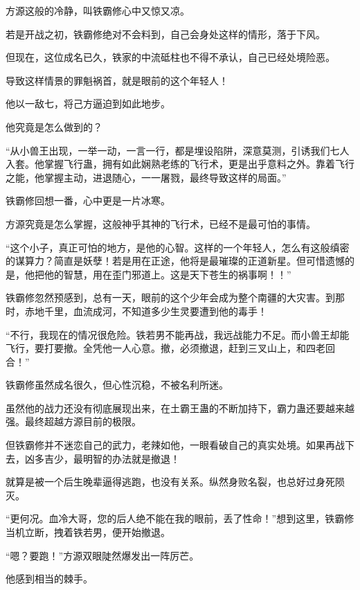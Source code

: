 
\begin{this_body}



方源这般的冷静，叫铁霸修心中又惊又凉。

若是开战之初，铁霸修绝对不会料到，自己会身处这样的情形，落于下风。

但现在，这位成名已久，铁家的中流砥柱也不得不承认，自己已经处境险恶。

导致这样情景的罪魁祸首，就是眼前的这个年轻人！

他以一敌七，将己方逼迫到如此地步。

他究竟是怎么做到的？

“从小兽王出现，一举一动，一言一行，都是埋设陷阱，深意莫测，引诱我们七人入套。他掌握飞行蛊，拥有如此娴熟老练的飞行术，更是出乎意料之外。靠着飞行之能，他掌握主动，进退随心，一一屠戮，最终导致这样的局面。”

铁霸修回想一番，心中更是一片冰寒。

方源究竟是怎么掌握，这般神乎其神的飞行术，已经不是最可怕的事情。

“这个小子，真正可怕的地方，是他的心智。这样的一个年轻人，怎么有这般缜密的谋算力？简直是妖孽！若是用在正途，他将是最璀璨的正道新星。但可惜遗憾的是，他把他的智慧，用在歪门邪道上。这是天下苍生的祸事啊！！”

铁霸修忽然预感到，总有一天，眼前的这个少年会成为整个南疆的大灾害。到那时，赤地千里，血流成河，不知道多少生灵要遭到他的毒手！

“不行，我现在的情况很危险。铁若男不能再战，我远战能力不足。而小兽王却能飞行，要打要撤。全凭他一人心意。撤，必须撤退，赶到三叉山上，和四老回合！”

铁霸修虽然成名很久，但心性沉稳，不被名利所迷。

虽然他的战力还没有彻底展现出来，在土霸王蛊的不断加持下，霸力蛊还要越来越强。最终超越方源目前的极限。

但铁霸修并不迷恋自己的武力，老辣如他，一眼看破自己的真实处境。如果再战下去，凶多吉少，最明智的办法就是撤退！

就算是被一个后生晚辈逼得逃跑，也没有关系。纵然身败名裂，也总好过身死陨灭。

“更何况。血冷大哥，您的后人绝不能在我的眼前，丢了性命！”想到这里，铁霸修当机立断，拽着铁若男，便开始撤退。

“嗯？要跑！”方源双眼陡然爆发出一阵厉芒。

他感到相当的棘手。


\end{this_body}
